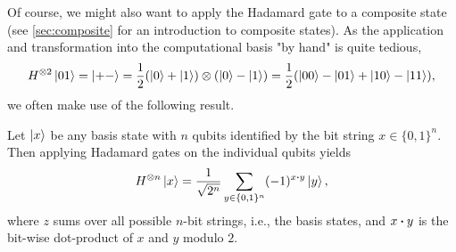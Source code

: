 				Of course, we might also want to apply the Hadamard gate to a composite state (see \autoref{sec:composite} for an introduction to composite states). As the application and transformation into the computational basis "by hand" is quite tedious,
				\begin{equation}
					H^{\otimes 2} \ket{01}
					= \ket{+-}
					= \frac{1}{2} (\ket{0} + \ket{1}) \otimes (\ket{0} - \ket{1})
					= \frac{1}{2} (\ket{00} - \ket{01} + \ket{10} - \ket{11}),
				\end{equation}
				we often make use of the following result.
				\begin{theorem}  \label{th:hadamardGate}
					Let \(\ket{x}\) be any basis state with \(n\) qubits identified by the bit string \( x \in \{ 0, 1 \}^n \). Then applying Hadamard gates on the individual qubits yields
					\begin{equation}
						H^{\otimes n} \ket{x} = \frac{1}{\sqrt{2^n}} \sum_{y \in \{ 0, 1 \}^n} (-1)^{x \dotproduct y} \ket{y},
					\end{equation}
					where \(z\) sums over all possible \(n\)-bit strings, i.e., the basis states, and \( x \dotproduct y \) is the bit-wise dot-product of \(x\) and \(y\) modulo \(2\).
				\end{theorem}
